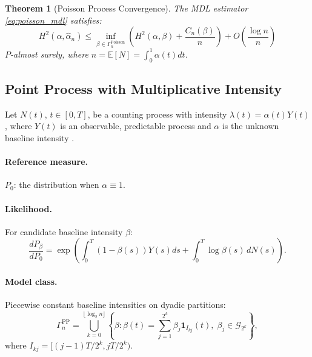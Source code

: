 \documentclass[preprint,review,12pt]{article}
\newtheorem{theorem}{Theorem}[section]
\begin{document}
\begin{theorem}[Poisson Process Convergence]\label{thm:poisson}
The MDL estimator \eqref{eq:poisson_mdl} satisfies:
\begin{equation}\label{eq:poisson_rate}
	H^2(\alpha, \hat{\alpha}_n) \leq \inf_{\beta \in \Gamma_n^{\text{Poisson}}} 
	\left( H^2(\alpha, \beta) + \frac{C_n(\beta)}{n} \right) + O\left( \frac{\log n}{n} \right)
\end{equation}
$P$-almost surely, where $n = \mathbb{E}[N] = \int_0^1 \alpha(t) dt$.
\end{theorem}

\subsection{Point Process with Multiplicative Intensity}
\label{subsec:point_process}

Let $N(t)$, $t \in [0, T]$, be a counting process with intensity 
$\lambda(t) = \alpha(t) Y(t)$, where $Y(t)$ is an observable, predictable 
process and $\alpha$ is the unknown baseline intensity \citep{Andersen1993}.

\paragraph{Reference measure.} $P_0$: the distribution when $\alpha \equiv 1$.

\paragraph{Likelihood.} For candidate baseline intensity $\beta$:
\begin{equation}\label{eq:pp_likelihood}
\frac{dP_\beta}{dP_0} = \exp\left( \int_0^T (1 - \beta(s)) Y(s) ds 
+ \int_0^T \log \beta(s) \, dN(s) \right).
\end{equation}

\paragraph{Model class.} Piecewise constant baseline intensities on dyadic 
partitions:
\begin{equation}\label{eq:pp_class}
\Gamma_n^{\text{PP}} = \bigcup_{k=0}^{\lfloor \log_2 n \rfloor} \left\{ 
\beta : \beta(t) = \sum_{j=1}^{2^k} \beta_j \mathbf{1}_{I_{kj}}(t), \; 
\beta_j \in \mathcal{G}_{2^k} \right\},
\end{equation}
where $I_{kj} = [(j-1)T/2^k, jT/2^k)$.
\end{document}
